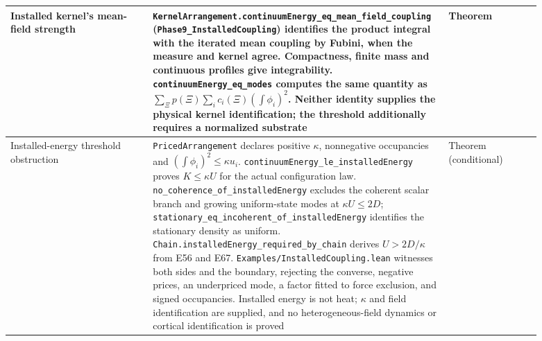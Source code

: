 \documentclass{article}
\begin{document}
\begin{longtable}{|>{\raggedright\arraybackslash}p{0.26\linewidth}|>{\raggedright\arraybackslash}p{0.46\linewidth}|>{\raggedright\arraybackslash}p{0.17\linewidth}|}
Installed kernel's mean-field strength & \nolinkurl{KernelArrangement.continuumEnergy_eq_mean_field_coupling} (\nolinkurl{Phase9_InstalledCoupling}) identifies the product integral with the iterated mean coupling by Fubini, when the measure and kernel agree. Compactness, finite mass and continuous profiles give integrability. \nolinkurl{continuumEnergy_eq_modes} computes the same quantity as $\sum_\Xi p(\Xi)\sum_i c_i(\Xi)(\int\phi_i)^2$. Neither identity supplies the physical kernel identification; the threshold additionally requires a normalized substrate & Theorem \\ \hline
Installed-energy threshold obstruction & \texttt{PricedArrangement} declares positive $\kappa$, nonnegative occupancies and $(\int\phi_i)^2\leq\kappa u_i$. \nolinkurl{continuumEnergy_le_installedEnergy} proves $K\leq\kappa U$ for the actual configuration law. \nolinkurl{no_coherence_of_installedEnergy} excludes the coherent scalar branch and growing uniform-state modes at $\kappa U\leq2D$; \nolinkurl{stationary_eq_incoherent_of_installedEnergy} identifies the stationary density as uniform. \nolinkurl{Chain.installedEnergy_required_by_chain} derives $U>2D/\kappa$ from E56 and E67. \nolinkurl{Examples/InstalledCoupling.lean} witnesses both sides and the boundary, rejecting the converse, negative prices, an underpriced mode, a factor fitted to force exclusion, and signed occupancies. Installed energy is not heat; $\kappa$ and field identification are supplied, and no heterogeneous-field dynamics or cortical identification is proved & Theorem (conditional) \\ \hline

\end{longtable}
\end{document}
